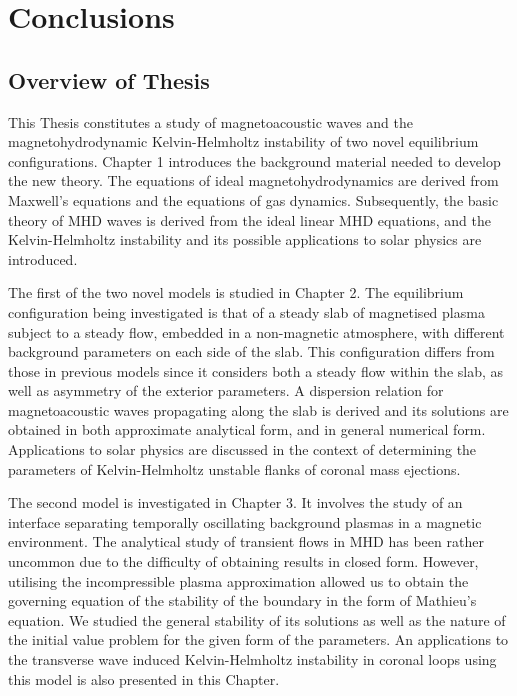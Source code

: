 
\chapter{Conclusions}

\section{Overview of Thesis}

This Thesis constitutes a study of magnetoacoustic waves and the magnetohydrodynamic Kelvin-Helmholtz instability of two novel equilibrium configurations.
Chapter 1 introduces the background material needed to develop the new theory.
The equations of ideal magnetohydrodynamics are derived from Maxwell's equations and the equations of gas dynamics.
Subsequently, the basic theory of MHD waves is derived from the ideal linear MHD equations, and the Kelvin-Helmholtz instability and its possible applications to solar physics are introduced.

The first of the two novel models is studied in Chapter 2.
The equilibrium configuration being investigated is that of a steady slab of magnetised plasma subject to a steady flow, embedded in a non-magnetic atmosphere, with different background parameters on each side of the slab.
This configuration differs from those in previous models since it considers both a steady flow within the slab, as well as asymmetry of the exterior parameters.
A dispersion relation for magnetoacoustic waves propagating along the slab is derived and its solutions are obtained in both approximate analytical form, and in general numerical form.
Applications to solar physics are discussed in the context of determining the parameters of Kelvin-Helmholtz unstable flanks of coronal mass ejections.

The second model is investigated in Chapter 3.
It involves the study of an interface separating temporally oscillating background plasmas in a magnetic environment.
The analytical study of transient flows in MHD has been rather uncommon due to the difficulty of obtaining results in closed form.
However, utilising the incompressible plasma approximation allowed us to obtain the governing equation of the stability of the boundary in the form of Mathieu's equation.
We studied the general stability of its solutions as well as the nature of the initial value problem for the given form of the parameters.
An applications to the transverse wave induced Kelvin-Helmholtz instability in coronal loops using this model is also presented in this Chapter.

